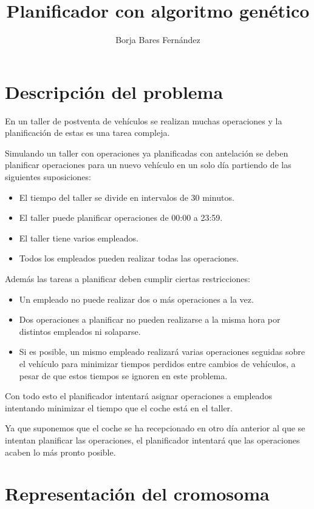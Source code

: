 \documentclass[11pt]{article}
\title{Planificador con algoritmo genético}
\author{Borja Bares Fernández}
\date{}
\begin{document}
	
	\maketitle
	
	\section{Descripción del problema}
	
	En un taller de postventa de vehículos se realizan muchas operaciones y la planificación de estas es una tarea compleja.
	
	Simulando un taller con operaciones ya planificadas con antelación se deben planificar operaciones para un nuevo vehículo en un solo día partiendo de las siguientes suposiciones:

	\begin{itemize}
		\item El tiempo del taller se divide en intervalos de 30 minutos.
		\item El taller puede planificar operaciones de 00:00 a 23:59.
		\item El taller tiene varios empleados.
		\item Todos los empleados pueden realizar todas las operaciones.
	\end{itemize}
	
	Además las tareas a planificar deben cumplir ciertas restricciones:
	
	\begin{itemize}
		\item Un empleado no puede realizar dos o más operaciones a la vez.
		\item Dos operaciones a planificar no pueden realizarse a la misma hora por distintos empleados ni solaparse.
		\item Si es posible, un mismo empleado realizará varias operaciones seguidas sobre el vehículo para minimizar tiempos perdidos entre cambios de vehículos, a pesar de que estos tiempos se ignoren en este problema.
	\end{itemize}
	
	Con todo esto el planificador intentará asignar operaciones a empleados intentando minimizar el tiempo que el coche está en el taller. 
	
	Ya que suponemos que el coche se ha recepcionado en otro día anterior al que se intentan planificar las operaciones, el planificador intentará que las operaciones acaben lo más pronto posible.
	
	\section{Representación del cromosoma}
	
\end{document}
